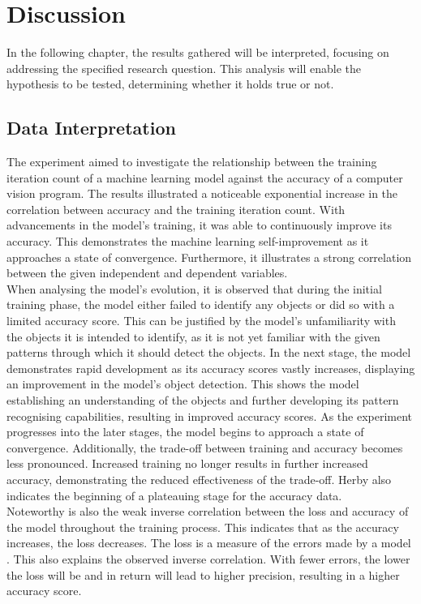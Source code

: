 \section{Discussion}
In the following chapter, the results gathered will be interpreted, focusing on addressing the specified research question. This analysis will enable the hypothesis to be tested, determining whether it holds true or not.

\subsection{Data Interpretation}

The experiment aimed to investigate the relationship between the training iteration count of a machine learning model against the accuracy of a computer vision program. The results illustrated a noticeable exponential increase in the correlation between accuracy and the training iteration count. With advancements in the model's training, it was able to continuously improve its accuracy. This demonstrates the machine learning self-improvement as it approaches a state of convergence. Furthermore, it illustrates a strong correlation between the given independent and dependent variables. \\

When analysing the model's evolution, it is observed that during the initial training phase, the model either failed to identify any objects or did so with a limited accuracy score. This can be justified by the model's unfamiliarity with the objects it is intended to identify, as it is not yet familiar with the given patterns through which it should detect the objects. In the next stage, the model demonstrates rapid development as its accuracy scores vastly increases, displaying an improvement in the model's object detection. This shows the model establishing an understanding of the objects and further developing its pattern recognising capabilities, resulting in improved accuracy scores. As the experiment progresses into the later stages, the model begins to approach a state of convergence. Additionally, the trade-off between training and accuracy becomes less pronounced. Increased training no longer results in further increased accuracy, demonstrating the reduced effectiveness of the trade-off. Herby also indicates the beginning of a plateauing stage for the accuracy data.  \\ 

Noteworthy is also the weak inverse correlation between the loss and accuracy of the model throughout the training process. This indicates that as the accuracy increases, the loss decreases. The loss is a measure of the errors made by a model \parencite{Baeldung2022}. This also explains the observed inverse correlation. With fewer errors, the lower the loss will be and in return will lead to higher precision, resulting in a higher accuracy score. \\

